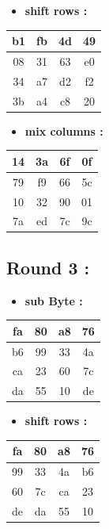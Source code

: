 \documentclass{article}
\begin{document}
\begin{itemize}
    \item \textbf{shift rows :}
\end{itemize} \begin{tabular}{|c|c|c|c|}
\hline b1 & fb & 4d & 49 \\ \hline 08 & 31 & 63 & e0 \\ \hline 34 & a7 & d2 & f2 \\ \hline 3b & a4 & c8 & 20 \\ \hline \end{tabular}\hspace{0.5cm}\vspace{0.1cm}\begin{itemize}
    \item \textbf{mix columns :}
\end{itemize} \begin{tabular}{|c|c|c|c|}
\hline 14 & 3a & 6f & 0f \\ \hline 79 & f9 & 66 & 5c \\ \hline 10 & 32 & 90 & 01 \\ \hline 7a & ed & 7c & 9c \\ \hline \end{tabular}\hspace{0.5cm}\vspace{0.1cm}\subsection*{Round 3 : }\begin{itemize}
    \item \textbf{sub Byte :}
\end{itemize} \begin{tabular}{|c|c|c|c|}
\hline fa & 80 & a8 & 76 \\ \hline b6 & 99 & 33 & 4a \\ \hline ca & 23 & 60 & 7c \\ \hline da & 55 & 10 & de \\ \hline \end{tabular}\hspace{0.5cm}\vspace{0.1cm}\begin{itemize}
    \item \textbf{shift rows :}
\end{itemize} \begin{tabular}{|c|c|c|c|}
\hline fa & 80 & a8 & 76 \\ \hline 99 & 33 & 4a & b6 \\ \hline 60 & 7c & ca & 23 \\ \hline de & da & 55 & 10 \\ \hline \end{tabular}\hspace{0.5cm}\vspace{0.1cm}\begin{itemize}

\end{itemize}
\end{document}

